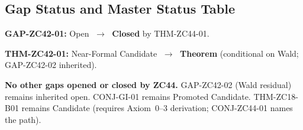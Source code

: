 \documentclass[12pt, a4paper]{article}
\begin{document}
\subsection{Gap Status and Master Status Table}


\begin{keybox}[title={Gap Closures and Promotions}]
\textbf{GAP-ZC42-01:} Open $\;\to\;$ \textbf{Closed}
by THM-ZC44-01.

\textbf{THM-ZC42-01:} Near-Formal Candidate $\;\to\;$
\textbf{Theorem} (conditional on Wald; GAP-ZC42-02 inherited).

\textbf{No other gaps opened or closed by ZC44.}
GAP-ZC42-02 (Wald residual) remains inherited open.
CONJ-GI-01 remains Promoted Candidate.
THM-ZC18-B01 remains Candidate (requires Axiom~0--3
derivation; CONJ-ZC44-01 names the path).
\end{keybox}

\bigskip
\end{document}
